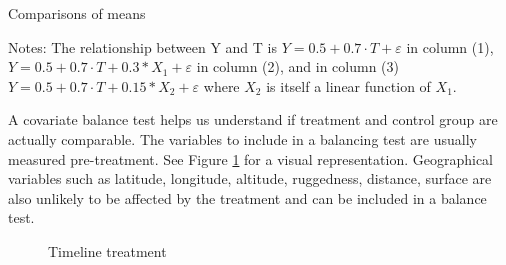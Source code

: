 \documentclass[11pt, oneside]{article}   	%
\begin{document}
\begin{table} [H]
\begin{center}
 
 \caption{Comparisons of means \label{t: selection}}



\linespread{1.5}
\vspace{0.1cm}
\par
\begin{minipage}{0.8\linewidth}
\baselineskip10pt
{\scriptsize {Notes:  The relationship between Y and T is $ Y=0.5+ 0.7 \cdot T+ \varepsilon $ in column (1), $ Y=0.5+ 0.7 \cdot T+0.3* X_1 + \varepsilon $ in column (2), and in column (3) $ Y=0.5+ 0.7 \cdot T+0.15* X_2 + \varepsilon $ where $X_2$ is itself a linear function of $X_1$.}}
\end{minipage}
\end{center}
\end{table}

\newpage

A covariate balance test helps us understand if treatment and control group are actually comparable. The variables to include in a balancing test are usually measured pre-treatment. See Figure  \ref{fig:tikz} for a visual representation. Geographical variables such as latitude, longitude, altitude, ruggedness, distance, surface are also unlikely to be affected by the treatment and can be included in a balance test. \\


\begin{figure}[H]
\caption{\label{fig:tikz} Timeline treatment }

\end{figure}
\end{document}
